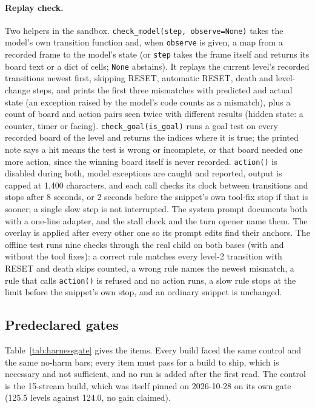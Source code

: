 \paragraph{Replay check.}
Two helpers in the sandbox. \texttt{check\_model(step, observe=None)} takes the model's own transition function and, when \texttt{observe} is given, a map from a recorded frame to the model's state (or \texttt{step} takes the frame itself and returns its board text or a dict of cells; \texttt{None} abstains). It replays the current level's recorded transitions newest first, skipping RESET, automatic RESET, death and level-change steps, and prints the first three mismatches with predicted and actual state (an exception raised by the model's code counts as a mismatch), plus a count of board and action pairs seen twice with different results (hidden state: a counter, timer or facing). %
\texttt{check\_goal(is\_goal)} runs a goal test on every recorded board of the level and returns the indices where it is true; the printed note says a hit means the test is wrong or incomplete, or that board needed one more action, since the winning board itself is never recorded. %
\texttt{action()} is disabled during both, model exceptions are caught and reported, output is capped at 1,400 characters, and each call checks its clock between transitions and stops after 8 seconds, or 2 seconds before the snippet's own tool-fix stop if that is sooner; a single slow step is not interrupted. The system prompt documents both with a one-line adapter, and the stall check and the turn opener name them. The overlay is applied after every other one so its prompt edits find their anchors. %
The offline test runs nine checks through the real child on both bases (with and without the tool fixes): a correct rule matches every level-2 transition with RESET and death skips counted, a wrong rule names the newest mismatch, a rule that calls \texttt{action()} is refused and no action runs, a slow rule stops at the limit before the snippet's own stop, and an ordinary snippet is unchanged. %

\subsection{Predeclared gates}

Table~\ref{tab:harnessgate} gives the items. Every build faced the same control and the same no-harm bars; every item must pass for a build to ship, which is necessary and not sufficient, and no run is added after the first read. The control is the 15-stream build, which was itself pinned on 2026-10-28 on its own gate (125.5 levels against 124.0, no gain claimed). %

